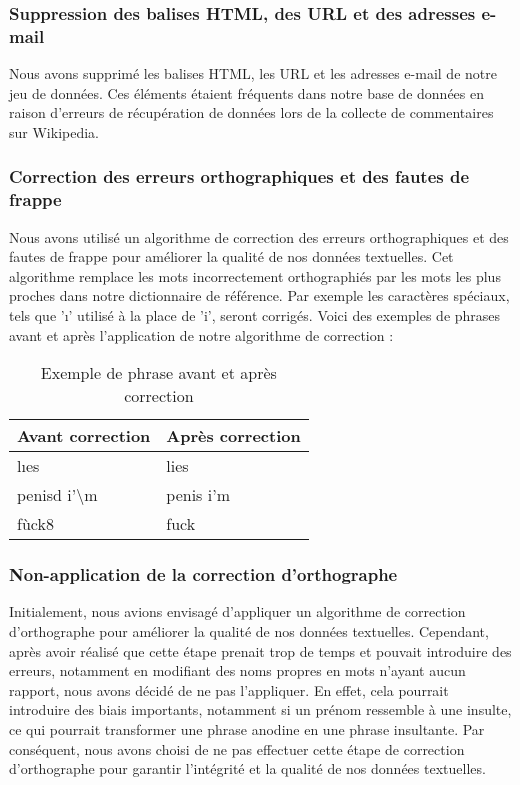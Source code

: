 \subsubsection*{Suppression des balises HTML, des URL et des adresses e-mail}

Nous avons supprimé les balises HTML, les URL et les adresses e-mail de notre jeu de données. Ces éléments étaient fréquents dans notre base de données en raison d'erreurs de récupération de données lors de la collecte de commentaires sur Wikipedia.

\subsubsection*{Correction des erreurs orthographiques et des fautes de frappe}

Nous avons utilisé un algorithme de correction des erreurs orthographiques et des fautes de frappe pour améliorer la qualité de nos données textuelles. Cet algorithme remplace les mots incorrectement orthographiés par les mots les plus proches dans notre dictionnaire de référence. Par exemple les caractères spéciaux, tels que 'ı' utilisé à la place de 'i', seront corrigés. Voici des exemples de phrases avant et après l'application de notre algorithme de correction :

\begin{table}[h]
    \centering
    \begin{tabular}{|l|l|}
    \hline
    \textbf{Avant correction} & \textbf{Après correction} \\ \hline
    lıes  & lies \\ \hline
    penisd i'\textbackslash m & penis i'm  \\ \hline
    fùck8 & fuck  \\ \hline
    \end{tabular}
    \caption{Exemple de phrase avant et après correction}
\end{table}

\subsubsection*{Non-application de la correction d'orthographe}
Initialement, nous avions envisagé d'appliquer un algorithme de correction d'orthographe pour améliorer la qualité de nos données textuelles. Cependant, après avoir réalisé que cette étape prenait trop de temps et pouvait introduire des erreurs, notamment en modifiant des noms propres en mots n'ayant aucun rapport, nous avons décidé de ne pas l'appliquer. En effet, cela pourrait introduire des biais importants, notamment si un prénom ressemble à une insulte, ce qui pourrait transformer une phrase anodine en une phrase insultante. Par conséquent, nous avons choisi de ne pas effectuer cette étape de correction d'orthographe pour garantir l'intégrité et la qualité de nos données textuelles.

